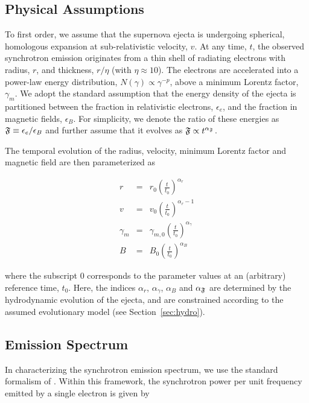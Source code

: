 \documentclass[12pt,preprint]{aastex}
\begin{document}
\subsection{Physical Assumptions}
\label{sec:app_phys_assump}

To first order, we assume that the supernova ejecta is undergoing
spherical, homologous expansion at sub-relativistic velocity, $v$.  At
any time, $t$, the observed synchrotron emission originates from a
thin shell of radiating electrons with radius, $r$, and thickness,
$r/\eta$ (with $\eta \approx 10$).  The electrons are accelerated into
a power-law energy distribution, $N(\gamma)\propto \gamma^{-p}$, above
a minimum Lorentz factor, $\gamma_m$.  We adopt the standard
assumption that the energy density of the ejecta is partitioned
between the fraction in relativistic electrons, $\epsilon_e$, and the
fraction in magnetic fields, $\epsilon_B$.  For simplicity, we denote
the ratio of these energies as $\frak{F}\equiv \epsilon_e/\epsilon_B$
and further assume that it evolves as $\frak{F} \propto
t^{\alpha_{\frak{F}}}$.

The temporal evolution of the radius, velocity, minimum Lorentz factor
and magnetic field are then parameterized as

\begin{eqnarray}
r & = & r_0\left(\frac{t}{t_0}\right)^{\alpha_r} 
\label{eqn:r_scaling} \\
v & = & v_0\left(\frac{t}{t_0}\right)^{\alpha_r-1}
\label{eqn:v_scaling} \\
\gamma_m & = & \gamma_{m,0}   \left(\frac{t}{t_0}\right)^{\alpha_{\gamma}} 
\label{eqn:gamma_scaling} \\
B & = & B_0\left(\frac{t}{t_0}\right)^{\alpha_B}
\label{eqn:B_scaling}
\end{eqnarray}

\noindent
where the subscript $0$ corresponds to the parameter values at an
(arbitrary) reference time, $t_0$.  Here, the indices $\alpha_r$,
$\alpha_{\gamma}$, $\alpha_B$ and $\alpha_{\frak{F}}$ are determined
by the hydrodynamic evolution of the ejecta, and are constrained
according to the assumed evolutionary model (see
Section~\ref{sec:hydro}).

\subsection{Emission Spectrum}

In characterizing the synchrotron emission spectrum, we use the
standard formalism of  \citet{rl79}.  Within this framework, the
synchrotron power per unit frequency emitted by a single electron is
given by
\end{document}
